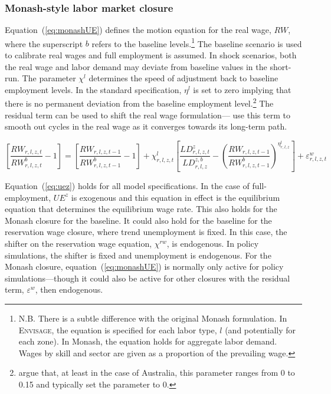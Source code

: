 \documentclass[11pt,letterpaper]{report}
\begin{document}
\subsubsection{Monash-style labor market closure}

Equation~(\ref{eq:monashUE}) defines the motion equation
for the real wage, $\mathit{RW}$, where the superscript
$b$ refers to the baseline levels.\footnote{N.B. There is
a subtle difference with the original Monash formulation. In \textsc{Envisage}, the
equation is specified for each labor type, $l$ (and potentially
for each zone). In Monash, the equation holds for aggregate labor
demand. Wages by skill and sector are given as a proportion of the
prevailing wage.} The baseline scenario is used
to calibrate real wages and full employment is assumed.
In shock scenarios, both the real wage and labor demand
may deviate from baseline values in the short-run.
The parameter $\chi^l$ determines the speed of adjustment
back to baseline employment levels. In the standard
specification, $\eta^l$ is set to zero implying that
there is no permanent deviation from the baseline
employment level.\footnote{\cite{DixonRimmer2002} argue that,
at least in the case of Australia, this parameter ranges
from 0 to 0.15 and typically set the parameter to 0.}
The residual term can be used to shift the real wage
formulation---\cite{DixonRimmer2002} use this term to
smooth out cycles in the real wage as it converges
towards its long-term path.

\begin{equation}
\label{eq:monashUE}
\left[\frac{\mathit{RW}_{r,l,z,t}}{\mathit{RW}^b_{r,l,z,t}} - 1\right]
= \left[\frac{\mathit{RW}_{r,l,z,t-1}}{\mathit{RW}^b_{r,l,z,t-1}} - 1\right] + \chi^l_{r,l,z,t}
\left[\frac{\mathit{LD}^z_{r,l,z,t}}{\mathit{LD}^{z,b}_{r,l,z}} -
\left( \frac{\mathit{RW}_{r,l,z,t-1}}{\mathit{RW}^b_{r,l,z,t-1}}\right)^{\eta^l_{r,l,z}}\right] + \varepsilon^w_{r,l,z,t}
\end{equation}

Equation~(\ref{eq:uez}) holds for all model specifications. In the case of full-employment, $\mathit{UE}^z$ is
exogenous and this equation in effect is the equilibrium equation that determines the equilibrium wage rate.
This also holds for the Monash closure for the baseline. It could also hold for the baseline for the reservation
wage closure, where trend unemployment is fixed. In this case, the shifter on the reservation wage equation, $\chi^{rw}$,
is endogenous. In policy simulations, the shifter is fixed and unemployment is endogenous.
For the Monash closure, equation~(\ref{eq:monashUE}) is normally only active for policy simulations---though
it could also be active for other closures with the residual term, $\varepsilon^w$, then endogenous.
\end{document}
